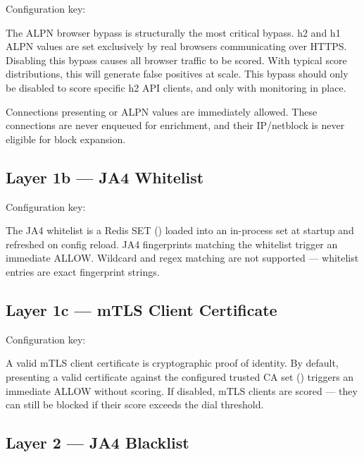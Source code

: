 Configuration key: 

\begin{dangerbox}
The ALPN browser bypass is structurally the most critical bypass. h2 and h1 ALPN values
are set exclusively by real browsers communicating over HTTPS. Disabling this bypass
causes all browser traffic to be scored. With typical score distributions, this will
generate false positives at scale. This bypass should only be disabled to score specific
h2 API clients, and only with monitoring in place.
\end{dangerbox}

Connections presenting  or  ALPN values are immediately allowed.
These connections are never enqueued for enrichment, and their IP/netblock is never
eligible for block expansion.

\subsection{Layer 1b — JA4 Whitelist}

Configuration key: 

The JA4 whitelist is a Redis SET () loaded into an in-process set
at startup and refreshed on config reload. JA4 fingerprints matching the whitelist
trigger an immediate ALLOW. Wildcard and regex matching are not supported —
whitelist entries are exact fingerprint strings.

\subsection{Layer 1c — mTLS Client Certificate}

Configuration key: 

A valid mTLS client certificate is cryptographic proof of identity. By default,
presenting a valid certificate against the configured trusted CA set
() triggers an immediate ALLOW without scoring.
If disabled, mTLS clients are scored — they can still be blocked if their score
exceeds the dial threshold.

\subsection{Layer 2 — JA4 Blacklist}

